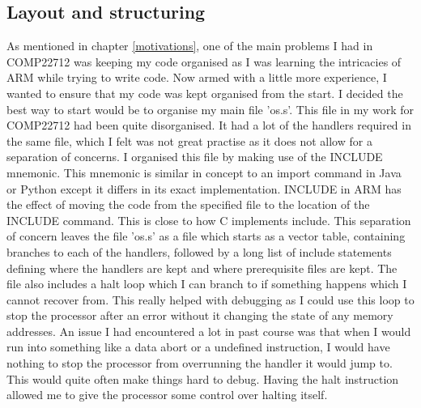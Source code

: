 \subsection{Layout and structuring}
As mentioned in chapter \ref{motivations}, one of the main problems I had in COMP22712 was keeping my code organised as I was learning the intricacies of ARM while trying to write code. Now armed with a little more experience, I wanted to ensure that my code was kept organised from the start. I decided the best way to start would be to organise my main file 'os.s'. This file in my work for COMP22712 had been quite disorganised. It had a lot of the handlers required in the same file, which I felt was not great practise as it does not allow for a separation of concerns. I organised this file by making use of the INCLUDE mnemonic. This mnemonic is similar in concept to an import command in Java or Python except it differs in its exact implementation. INCLUDE in ARM has the effect of moving the code from the specified file to the location of the INCLUDE command. This is close to how C implements include. %
This separation of concern leaves the file 'os.s' as a file which starts as a vector table, containing branches to each of the handlers, followed by a long list of include statements defining where the handlers are kept and where prerequisite files are kept. The file also includes a halt loop which I can branch to if something happens which I cannot recover from. This really helped with debugging as I could use this loop to stop the processor after an error without it changing the state of any memory addresses. An issue I had encountered a lot in past course was that when I would run into something like a data abort or a undefined instruction, I would have nothing to stop the processor from overrunning the handler it would jump to. This would quite often make things hard to debug. Having the halt instruction allowed me to give the processor some control over halting itself.
